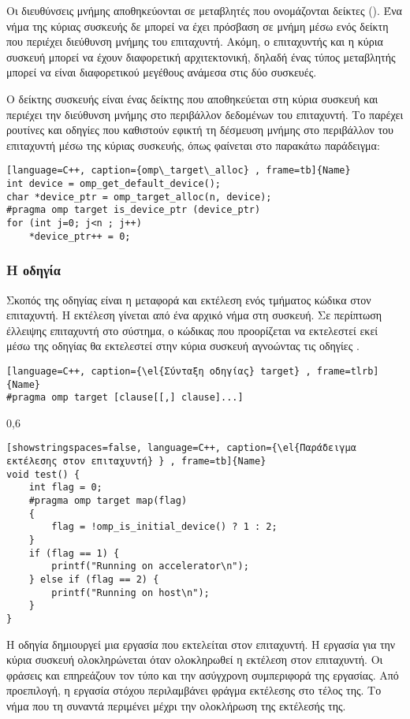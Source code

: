 Οι διευθύνσεις μνήμης αποθηκεύονται σε μεταβλητές που ονομάζονται δείκτες (\emph{}). Ένα νήμα της κύριας συσκευής δε μπορεί να έχει πρόσβαση σε μνήμη μέσω ενός δείκτη που περιέχει διεύθυνση μνήμης του επιταχυντή. Ακόμη, ο επιταχυντής και η κύρια συσκευή μπορεί να έχουν διαφορετική αρχιτεκτονική, δηλαδή ένας τύπος μεταβλητής μπορεί να είναι διαφορετικού μεγέθους ανάμεσα στις δύο συσκευές.

Ο δείκτης συσκευής \emph{} είναι ένας δείκτης που αποθηκεύεται στη κύρια συσκευή και περιέχει την διεύθυνση μνήμης στο περιβάλλον δεδομένων του επιταχυντή. Το \emph{} παρέχει ρουτίνες και οδηγίες που καθιστούν εφικτή τη δέσμευση μνήμης στο περιβάλλον του επιταχυντή μέσω της κύριας συσκευής, όπως φαίνεται στο παρακάτω παράδειγμα:


\begin{lstlisting}[language=C++, caption={omp\_target\_alloc} , frame=tb]{Name}
int device = omp_get_default_device();
char *device_ptr = omp_target_alloc(n, device);
#pragma omp target is_device_ptr (device_ptr)
for (int j=0; j<n ; j++)
	*device_ptr++ = 0;
\end{lstlisting}
\clearpage


\subsubsection{Η οδηγία }
Σκοπός της οδηγίας \emph{} είναι η μεταφορά και εκτέλεση ενός τμήματος κώδικα στον επιταχυντή. Η εκτέλεση γίνεται από ένα αρχικό νήμα στη συσκευή. Σε περίπτωση έλλειψης επιταχυντή στο σύστημα, ο κώδικας που προορίζεται να εκτελεστεί εκεί μέσω της οδηγίας \emph{} θα εκτελεστεί στην κύρια συσκευή αγνοώντας τις οδηγίες \emph{}.

\begin{lstlisting}[language=C++, caption={\el{Σύνταξη οδηγίας} target} , frame=tlrb]{Name}
#pragma omp target [clause[[,] clause]...]
\end{lstlisting}

\begin{spacing}{0,6}
\begin{lstlisting}[showstringspaces=false, language=C++, caption={\el{Παράδειγμα εκτέλεσης στον επιταχυντή} } , frame=tb]{Name}
void test() {
	int flag = 0;
	#pragma omp target map(flag)
	{
		flag = !omp_is_initial_device() ? 1 : 2;
	}
	if (flag == 1) {
		printf("Running on accelerator\n");
	} else if (flag == 2) {
		printf("Running on host\n");
	}
}
\end{lstlisting}
\end{spacing}
Η οδηγία \emph{} δημιουργεί μια εργασία που εκτελείται στον επιταχυντή. Η εργασία για την κύρια συσκευή
ολοκληρώνεται όταν ολοκληρωθεί η εκτέλεση στον επιταχυντή. Οι φράσεις \emph{} και \emph{}
επηρεάζουν τον τύπο και την ασύγχρονη συμπεριφορά της εργασίας. Από προεπιλογή, η εργασία στόχου περιλαμβάνει φράγμα
εκτέλεσης στο τέλος της. Το νήμα που τη συναντά περιμένει μέχρι την ολοκλήρωση της εκτέλεσής της.

